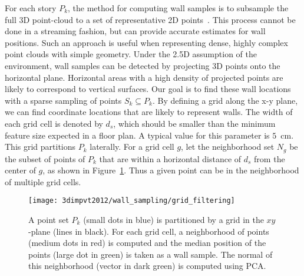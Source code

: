 \documentclass[12pt,onecolumn,oneside]{book}
\begin{document}
For each story $P_k$, the method for computing wall samples is to subsample the full 3D point-cloud to a set of representative 2D points~\cite{Turner12,Turner14,Turner14Journal,Okorn09}.  This process cannot be done in a streaming fashion, but can provide accurate estimates for wall positions.  Such an approach is useful when representing dense, highly complex point clouds with simple geometry.  Under the 2.5D assumption of the environment, wall samples can be detected by projecting 3D points onto the horizontal plane.  Horizontal areas with a high density of projected points are likely to correspond to vertical surfaces.  Our goal is to find these wall locations with a sparse sampling of points $S_k \subseteq P_k$.  By defining a grid along the x-y plane, we can find coordinate locations that are likely to represent walls.  The width of each grid cell is denoted by $d_s$, which should be smaller than the minimum feature size expected in a floor plan.  A typical value for this parameter is $5$~cm.  This grid partitions $P_k$ laterally.  For a grid cell $g$, let the neighborhood set $N_g$ be the subset of points of $P_k$ that are within a horizontal distance of $d_s$ from the center of $g$, as shown in Figure~\ref{fig:grid_filtering}.  Thus a given point can be in the neighborhood of multiple grid cells.

\begin{figure}

\begin{minipage}{1.0\linewidth}
  \centering
  \centerline{\texttt{[image: 3dimpvt2012/wall\_sampling/grid\_filtering]}}
\end{minipage}

\caption[Generating wall samples from 3D point clouds.]{A point set $P_k$ (small dots in blue) is partitioned by a grid in the $xy$-plane (lines in black).  For each grid cell, a neighborhood of points (medium dots in red) is computed and the median position of the points (large dot in green) is taken as a wall sample.  The normal of this neighborhood (vector in dark green) is computed using PCA.}
\label{fig:grid_filtering}

\end{figure}
\end{document}
